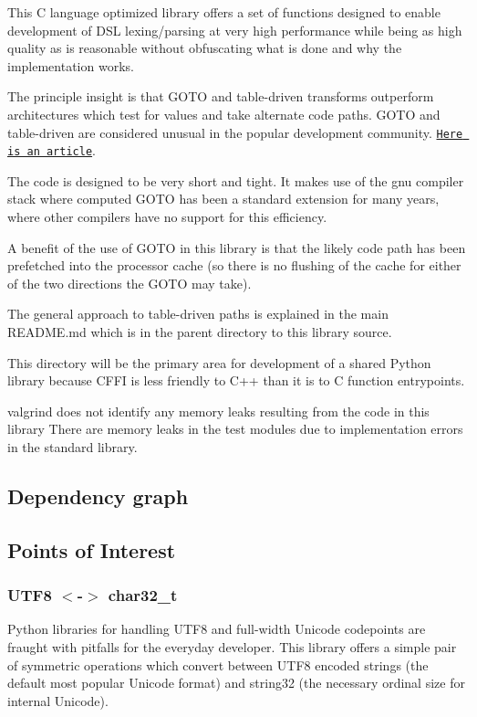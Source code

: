 This C language optimized library offers a set of functions designed to enable development of D\+SL lexing/parsing at very high performance while being as high quality as is reasonable without obfuscating what is done and why the implementation works.

The principle insight is that G\+O\+TO and table-\/driven transforms outperform architectures which test for values and take alternate code paths. G\+O\+TO and table-\/driven are considered unusual in the popular development community. \href{http://eli.thegreenplace.net/2012/07/12/computed-goto-for-efficient-dispatch-tables}{\tt Here is an article}.

The code is designed to be very short and tight. It makes use of the gnu compiler stack where computed G\+O\+TO has been a standard extension for many years, where other compilers have no support for this efficiency.

A benefit of the use of G\+O\+TO in this library is that the likely code path has been prefetched into the processor cache (so there is no flushing of the cache for either of the two directions the G\+O\+TO may take).

The general approach to table-\/driven paths is explained in the main R\+E\+A\+D\+M\+E.\+md which is in the parent directory to this library source.

This directory will be the primary area for development of a shared Python library because C\+F\+FI is less friendly to C++ than it is to C function entrypoints.

valgrind does not identify any memory leaks resulting from the code in this library There are memory leaks in the test modules due to implementation errors in the standard library.

\subsection*{Dependency graph}



\subsection*{Points of Interest}

\subsubsection*{U\+T\+F8 $<$-\/$>$ char32\+\_\+t}

Python libraries for handling U\+T\+F8 and full-\/width Unicode codepoints are fraught with pitfalls for the everyday developer. This library offers a simple pair of symmetric operations which convert between U\+T\+F8 encoded strings (the default most popular Unicode format) and string32 (the necessary ordinal size for internal Unicode).

